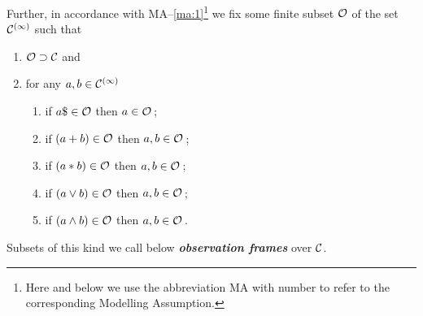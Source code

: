 Further, in accordance with MA--\ref{ma:1}\footnote{Here and below we use the abbreviation MA with number to refer to the corresponding Modelling Assumption.} we fix some finite subset $\clocks[o]$ of the set $\clocks[\infty]$ such that
\begin{enumerate}
\item
$\clocks[o]\supset\clocks$ and
\item
for any $a,b\in\clocks[\infty]$
\begin{enumerate}
\item
if $a\$\in\clocks[o]$ then $a\in\clocks[o]$\,;
\item
if $(a+b)\in\clocks[o]$ then $a,b\in\clocks[o]$\,;
\item
if $(a\ast b)\in\clocks[o]$ then $a,b\in\clocks[o]$\,;
\item
if $(a\vee b)\in\clocks[o]$ then $a,b\in\clocks[o]$\,;
\item
if $(a\wedge b)\in\clocks[o]$ then $a,b\in\clocks[o]$\,.
\end{enumerate}
\end{enumerate}
Subsets of this kind we call below {\it\bfseries observation frames} over $\clocks$.
